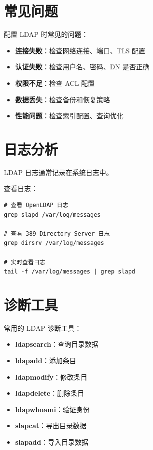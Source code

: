 \documentclass[12pt,UTF8]{ctexbook}
\begin{document}
\section{常见问题}
\label{sec:common_problems}

配置 LDAP 时常见的问题：

\begin{itemize}
    \item \textbf{连接失败}：检查网络连接、端口、TLS 配置
    \item \textbf{认证失败}：检查用户名、密码、DN 是否正确
    \item \textbf{权限不足}：检查 ACL 配置
    \item \textbf{数据丢失}：检查备份和恢复策略
    \item \textbf{性能问题}：检查索引配置、查询优化
\end{itemize}

\section{日志分析}
\label{sec:log_analysis}

LDAP 日志通常记录在系统日志中。

查看日志：
\begin{verbatim}
# 查看 OpenLDAP 日志
grep slapd /var/log/messages

# 查看 389 Directory Server 日志
grep dirsrv /var/log/messages

# 实时查看日志
tail -f /var/log/messages | grep slapd
\end{verbatim}

\section{诊断工具}
\label{sec:diagnostic_tools}

常用的 LDAP 诊断工具：

\begin{itemize}
    \item \textbf{ldapsearch}：查询目录数据
    \item \textbf{ldapadd}：添加条目
    \item \textbf{ldapmodify}：修改条目
    \item \textbf{ldapdelete}：删除条目
    \item \textbf{ldapwhoami}：验证身份
    \item \textbf{slapcat}：导出目录数据
    \item \textbf{slapadd}：导入目录数据
\end{itemize}
\end{document}
